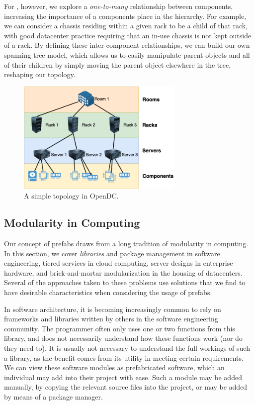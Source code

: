 \documentclass[11pt]{article}
\begin{document}
		For \opendc{}, however, we explore a \textit{one-to-many} relationship between components, increasing the importance of a components place in the hierarchy.
		For example, we can consider a chassis residing within a given rack to be a child of that rack, with good datacenter practice requiring that an in-use chassis is not kept outside of a rack.
		By defining these inter-component relationships, we can build our own spanning tree model, which allows us to easily manipulate parent objects and all of their children by simply moving the parent object elsewhere in the tree, reshaping our topology.
		\begin{figure}[]
			\centering
			\includegraphics[width=8cm]{opendc-topology.png}
			\caption[A simple topology in OpenDC]{A simple topology in OpenDC.}
			\label{fig:example-opendc-topology}
		\end{figure}
	
	\subsection{Modularity in Computing}
		Our concept of prefabs draws from a long tradition of modularity in computing.
		In this section, we cover \textit{libraries} and package management in software engineering, tiered services in cloud computing, server designs in enterprise hardware, and brick-and-mortar modularization in the housing of datacenters.
		Several of the approaches taken to these problems use solutions that we find to have desirable characteristics when considering the usage of prefabs.

		In software architecture, it is becoming increasingly common to rely on frameworks and libraries written by others in the software engineering community. 
		The programmer often only uses one or two functions from this library, and does not necessarily understand how these functions work (nor do they need to).
		It is usually not necessary to understand the full workings of such a library, as the benefit comes from its utility in meeting certain requirements. 
		We can view these software modules as prefabricated software, which an individual may add into their project with ease. 
		Such a module may be added manually, by copying the relevant source files into the project, or may be added by means of a package manager.
		
\end{document}
